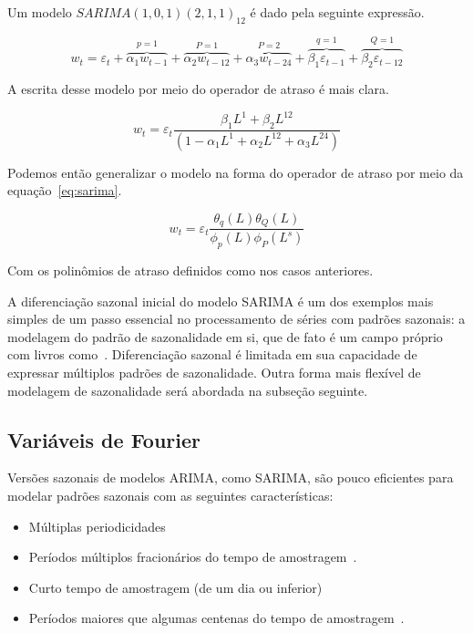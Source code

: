 Um modelo $SARIMA(1, 0, 1)(2, 1, 1)_{12}$ é dado pela seguinte expressão.

$$ w_t = \varepsilon_t + \overbrace{\alpha_1 w_{t-1}}^{p = 1} + \overbrace{
\alpha_2 w_{t-12}}^{P=1} + \overbrace{\alpha_3 w_{t-24}}^{P=2} +
\overbrace{\beta_1 \varepsilon_{t-1}}^{q=1} + \overbrace{\beta_2
\varepsilon_{t-12}}^{Q=1}$$

A escrita desse modelo por meio do operador de atraso é mais clara.

$$  w_t = \varepsilon_t \frac{\beta_1 L^1 + \beta_2 L^{12}}{(1 - \alpha_1 L^1 + \alpha_2 L^{12} + \alpha_3 L^{24})}  $$

Podemos então generalizar o modelo na forma do operador de atraso por meio da
equação~\ref{eq:sarima}.

\begin{equation}\label{eq:sarima}
    w_t = \varepsilon_{t} \frac{\theta_q(L)\theta_Q(L)}{\phi_p (L) \phi_P (L^s)}
\end{equation}

Com os polinômios de atraso definidos como nos casos anteriores.

A diferenciação sazonal inicial do modelo SARIMA é um dos exemplos mais simples
de um passo essencial no processamento de séries com padrões sazonais: a
modelagem do padrão de sazonalidade em si, que de fato é um campo próprio com
livros como~\cite{x11}. Diferenciação sazonal é limitada em sua capacidade de
expressar múltiplos padrões de sazonalidade. Outra forma mais flexível de
modelagem de sazonalidade será abordada na subseção seguinte.

\subsection{Variáveis de Fourier}

Versões sazonais de modelos ARIMA, como SARIMA, são pouco eficientes para
modelar padrões sazonais com as seguintes características:

\begin{itemize}
    \item Múltiplas periodicidades~\cite{athana}
    \item Períodos múltiplos fracionários do tempo de amostragem~\cite{hyndman_weekly}.
    \item Curto tempo de amostragem (de um dia ou inferior)~\cite{athana}
    \item Períodos maiores que algumas centenas do tempo de
    amostragem~\cite{hyndman_long_season}.
\end{itemize}

